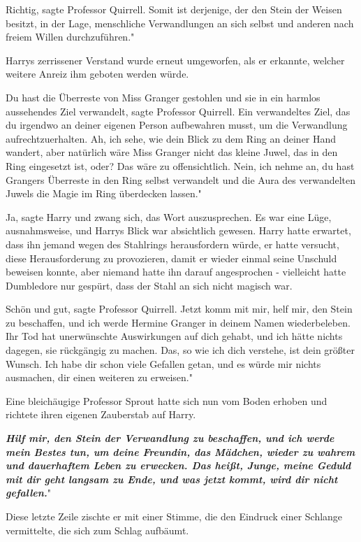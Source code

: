 \glqq Richtig\grqq{}, sagte Professor Quirrell. \glqq Somit ist derjenige, der
den Stein der Weisen besitzt, in der Lage, menschliche Verwandlungen an sich
selbst und anderen nach freiem Willen durchzuführen."

Harrys zerrissener Verstand wurde erneut umgeworfen, als er erkannte, welcher
weitere Anreiz ihm geboten werden würde.

\glqq Du hast die Überreste von Miss Granger gestohlen und sie in ein harmlos
aussehendes Ziel verwandelt\grqq{}, sagte Professor Quirrell. \glqq Ein
verwandeltes Ziel, das du irgendwo an deiner eigenen Person aufbewahren musst,
um die Verwandlung aufrechtzuerhalten. Ah, ich sehe, wie dein Blick zu dem Ring
an deiner Hand wandert, aber natürlich wäre Miss Granger nicht das kleine Juwel,
das in den Ring eingesetzt ist, oder? Das wäre zu offensichtlich. Nein, ich
nehme an, du hast Grangers Überreste in den Ring selbst verwandelt und die Aura
des verwandelten Juwels die Magie im Ring überdecken lassen."

\glqq Ja\grqq{}, sagte Harry und zwang sich, das Wort auszusprechen. Es war eine
Lüge, ausnahmsweise, und Harrys Blick war absichtlich gewesen. Harry hatte
erwartet, dass ihn jemand wegen des Stahlrings herausfordern würde, er hatte
versucht, diese Herausforderung zu provozieren, damit er wieder einmal seine
Unschuld beweisen konnte, aber niemand hatte ihn darauf angesprochen -
vielleicht hatte Dumbledore nur gespürt, dass der Stahl an sich nicht magisch
war.

\glqq Schön und gut\grqq{}, sagte Professor Quirrell. \glqq Jetzt komm mit mir,
helf mir, den Stein zu beschaffen, und ich werde Hermine Granger in deinem Namen
wiederbeleben. Ihr Tod hat unerwünschte Auswirkungen auf dich gehabt, und ich
hätte nichts dagegen, sie rückgängig zu machen. Das, so wie ich dich verstehe,
ist dein größter Wunsch. Ich habe dir schon viele Gefallen getan, und es würde
mir nichts ausmachen, dir einen weiteren zu erweisen."

Eine bleichäugige Professor Sprout hatte sich nun vom Boden erhoben und richtete
ihren eigenen Zauberstab auf Harry.

\glqq \textbf{\emph{Hilf mir, den Stein der Verwandlung zu beschaffen, und ich
werde mein Bestes tun, um deine Freundin, das Mädchen, wieder zu wahrem und
dauerhaftem Leben zu erwecken. Das heißt, Junge, meine Geduld mit dir geht
langsam zu Ende, und was jetzt kommt, wird dir nicht gefallen.}}"

Diese letzte Zeile zischte er mit einer Stimme, die den Eindruck einer Schlange
vermittelte, die sich zum Schlag aufbäumt.

